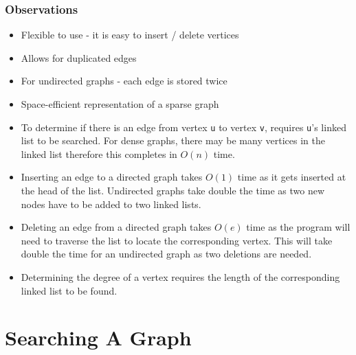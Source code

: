 \subsubsection{Observations}
\begin{itemize}
    \item Flexible to use - it is easy to insert / delete vertices
    \item Allows for duplicated edges
    \item For undirected graphs - each edge is stored twice
    \item Space-efficient representation of a sparse graph
    \item To determine if there is an edge from vertex \verb|u| to vertex \verb|v|, requires \verb|u|'s linked list to be searched. For dense graphs, there may be many vertices in the linked list therefore this completes in $O(n)$ time. 
    \item Inserting an edge to a directed graph takes $O(1)$ time as it gets inserted at the head of the list. Undirected graphs take double the time as two new nodes have to be added to two linked lists.
    \item Deleting an edge from a directed graph takes $O(e)$ time as the program will need to traverse the list to locate the corresponding vertex. This will take double the time for an undirected graph as two deletions are needed. 
    \item Determining the degree of a vertex requires the length of the corresponding linked list to be found. 
\end{itemize}

\section{Searching A Graph}

